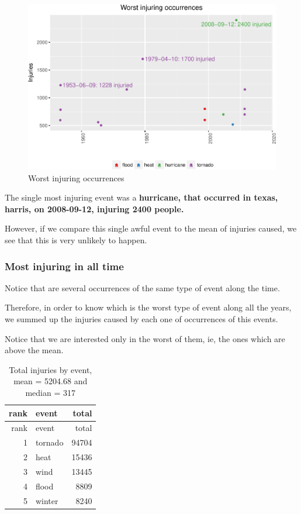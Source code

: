 \documentclass[]{article}
\begin{document}
\begin{figure}[htbp]
\centering
\includegraphics{readme_files/figure-latex/injuring-single-plot-1.pdf}
\caption{Worst injuring occurrences}
\end{figure}

The single most injuring event was a \textbf{hurricane, that occurred in
texas, harris, on 2008-09-12, injuring 2400 people.}

However, if we compare this single awful event to the mean of injuries
caused, we see that this is very unlikely to happen.

\subsubsection{Most injuring in all
time}\label{most-injuring-in-all-time}

Notice that are several occurrences of the same type of event along the
time.

Therefore, in order to know which is the worst type of event along all
the years, we summed up the injuries caused by each one of occurrences
of this events.

Notice that we are interested only in the worst of them, ie, the ones
which are above the mean.

\begin{longtable}[]{@{}rlr@{}}
\caption{Total injuries by event, mean = 5204.68 and median =
317}\tabularnewline
\toprule
rank & event & total\tabularnewline
\midrule
\endfirsthead
\toprule
rank & event & total\tabularnewline
\midrule
\endhead
1 & tornado & 94704\tabularnewline
2 & heat & 15436\tabularnewline
3 & wind & 13445\tabularnewline
4 & flood & 8809\tabularnewline
5 & winter & 8240\tabularnewline
\bottomrule
\end{longtable}
\end{document}
